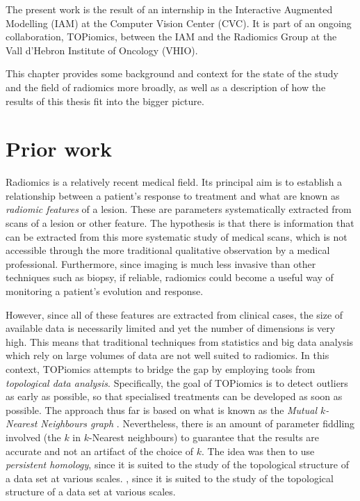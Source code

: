 \documentclass[../main.tex]{subfiles}
\begin{document}
The present work is the result of an internship in the Interactive Augmented Modelling
(IAM) at the Computer Vision Center (CVC). It is part of an ongoing collaboration,
TOPiomics, between the IAM and the Radiomics Group at the Vall d'Hebron Institute of
Oncology (VHIO).  

This chapter provides some background and context for the state of the study and the
field of radiomics more broadly, as well as a description of how the results of this
thesis fit into the bigger picture. 

\section{Prior work}\label{sec:prior work}
Radiomics is a relatively recent medical field. Its principal aim is to establish a
relationship between a patient's response to treatment and what are known as
\emph{radiomic features} of a lesion. These are parameters systematically extracted from
scans of a lesion or other feature. The hypothesis is that there is information
that can be extracted from this more systematic study of medical scans, which is not
accessible through the more traditional qualitative observation by a medical professional.
Furthermore, since imaging is much less invasive than other techniques such as biopsy, if
reliable, radiomics could become a useful way of monitoring a patient's evolution and
response. 

However, since all of these features are extracted from clinical cases, the size of
available data is necessarily limited and yet the number of dimensions is very high. This
means that traditional techniques from statistics and big data analysis which rely on
large volumes of data are not well suited to radiomics. In this context, TOPiomics
\cite{topiomics, attract} attempts to bridge the gap by employing tools from
\emph{topological data analysis}. Specifically, the goal of TOPiomics is to detect
outliers as early as possible, so that specialised treatments can be developed as soon as
possible. The approach thus far is based on what is known as the \emph{Mutual \( k
\)-Nearest Neighbours graph} \cite{outliers}. Nevertheless, there is an amount of
parameter fiddling involved (the \( k \) in \( k \)-Nearest neighbours)	to guarantee that
the results are accurate and not an artifact of the choice of \( k \). The idea was then
to use \emph{persistent homology}, since it is suited to the study of the topological
structure of a data set at various scales. , since it is suited to the study of the
topological structure of a data set at various scales. 
\end{document}
